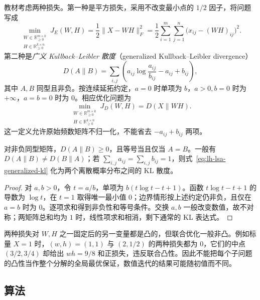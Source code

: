教材考虑两种损失。第一种是平方损失，采用不改变最小点的 $1/2$ 因子，将问题写成
\begin{equation}
\min_{\substack{W\in\mathbb R_{\geq0}^{m\times k}\\H\in\mathbb R_{\geq0}^{k\times n}}}
J_E(W,H)=\frac12\|X-WH\|_F^2
=\frac12\sum_{i=1}^m\sum_{j=1}^n\bigl(x_{ij}-(WH)_{ij}\bigr)^2.
\label{eq:lh-lsa-nmf-euclidean}
\end{equation}
第二种是\emph{广义 Kullback--Leibler 散度}（generalized Kullback--Leibler divergence）
\begin{equation}
D(A\|B)=\sum_{i,j}\left(a_{ij}\log\frac{a_{ij}}{b_{ij}}-a_{ij}+b_{ij}\right),
\label{eq:lh-lsa-generalized-kl}
\end{equation}
其中 $A,B$ 同型且非负。按连续延拓约定，$a=0$ 时单项为 $b$，$a>0,b=0$ 时为 $+\infty$，$a=b=0$ 时为 $0$。相应优化问题为
\begin{equation}
\min_{\substack{W\in\mathbb R_{\geq0}^{m\times k}\\H\in\mathbb R_{\geq0}^{k\times n}}}
J_D(W,H)=D(X\|WH).
\label{eq:lh-lsa-nmf-divergence}
\end{equation}
这一定义允许原始频数矩阵不归一化，不能省去 $-a_{ij}+b_{ij}$ 两项。

\begin{proposition}[散度的基本性质]
\label{prop:lh-lsa-kl-properties}
对非负同型矩阵，$D(A\|B)\geq0$，且等号当且仅当 $A=B$。一般有 $D(A\|B)\ne D(B\|A)$；若 $\sum_{i,j}a_{ij}=\sum_{i,j}b_{ij}=1$，则式~\eqref{eq:lh-lsa-generalized-kl} 化为两个离散概率分布之间的 KL 散度。
\end{proposition}
\begin{proof}
对 $a,b>0$，令 $t=a/b$，单项为 $b(t\log t-t+1)$。函数 $t\log t-t+1$ 的导数为 $\log t$，在 $t=1$ 取得唯一最小值 $0$；边界情形按上述约定仍非负，且仅在 $a=b$ 时为 $0$。逐项求和得到非负性和等号条件。交换 $a,b$ 一般改变数值，故不对称；两矩阵总和均为 $1$ 时，线性项求和相消，剩下通常的 KL 表达式。
\end{proof}

两种损失对 $W,H$ 之一固定后的另一变量都是凸的，但联合优化一般非凸。例如标量 $X=1$ 时，$(w,h)=(1,1)$ 与 $(2,1/2)$ 的两种损失都为 $0$，它们的中点 $(3/2,3/4)$ 却给出 $wh=9/8$ 和正损失，违反联合凸性。因此不能把每个子问题的凸性当作整个分解的全局最优保证，数值迭代的结果可能随初值而不同。

\subsection{算法}
\label{subsec:lh-lsa-nmf-algorithm}

